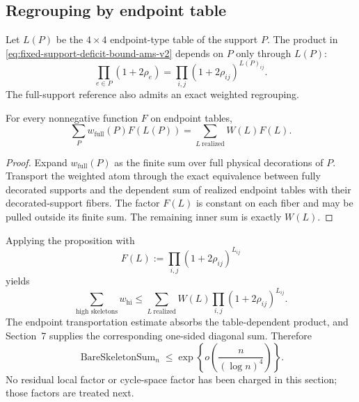 \subsection{Regrouping by endpoint table}

Let $L(P)$ be the $4\times4$ endpoint-type table of the support $P$.  The
product in \eqref{eq:fixed-support-deficit-bound-ams-v2} depends on $P$ only
through $L(P)$:
\[
  \prod_{e\in P}(1+2\rho_e)
  =
  \prod_{i,j}(1+2\rho_{ij})^{L(P)_{ij}}.
\]
The full-support reference also admits an exact weighted regrouping.

\begin{proposition}
\label{prop:weighted-reference-regrouping-ams-v2}
For every nonnegative function $F$ on endpoint tables,
\[
  \sum_P w_{\mathrm{full}}(P)F(L(P))
  =
  \sum_{L\ \mathrm{realized}}W(L)F(L).
\]
\end{proposition}

\begin{proof}
Expand $w_{\mathrm{full}}(P)$ as the finite sum over full physical decorations
of $P$.  Transport the weighted atom through the exact equivalence between
fully decorated supports and the dependent sum of realized endpoint tables
with their decorated-support fibers.  The factor $F(L)$ is constant on each
fiber and may be pulled outside its finite sum.  The remaining inner sum is
exactly $W(L)$.
\end{proof}

Applying the proposition with
\[
  F(L):=\prod_{i,j}(1+2\rho_{ij})^{L_{ij}}
\]
yields
\[
  \sum_{\text{high skeletons}}w_{\mathrm{hi}}
  \le
  \sum_{L\ \mathrm{realized}}
    W(L)\prod_{i,j}(1+2\rho_{ij})^{L_{ij}}.
\]
The endpoint transportation estimate absorbs the table-dependent product, and
Section~7 supplies the corresponding one-sided diagonal sum.  Therefore
\begin{equation}
  \operatorname{BareSkeletonSum}_n
  \le
  \exp\!\left\{
    o\!\left(\frac{n}{(\log n)^4}\right)
  \right\}.
  \label{eq:bare-skeleton-final-ams-v2}
\end{equation}
No residual local factor or cycle-space factor has been charged in this
section; those factors are treated next.
